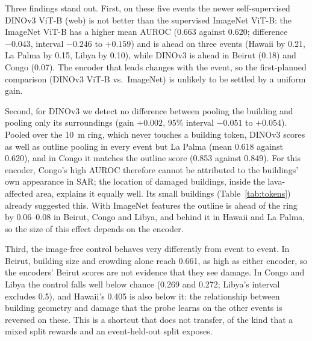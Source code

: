 \documentclass[journal]{IEEEtran}
\begin{document}
Three findings stand out. First, on these five events the newer self-supervised DINOv3 ViT-B (web) is not better than the supervised ImageNet ViT-B: the ImageNet ViT-B has a higher mean AUROC (0.663 against 0.620; difference $-0.043$, interval $-0.246$ to $+0.159$) and is ahead on three events (Hawaii by 0.21, La Palma by 0.15, Libya by 0.10), while DINOv3 is ahead in Beirut (0.18) and Congo (0.07). The encoder that leads changes with the event, so the first-planned comparison (DINOv3 ViT-B vs.\ ImageNet) is unlikely to be settled by a uniform gain.

Second, for DINOv3 we detect no difference between pooling the building and pooling only its surroundings (gain $+0.002$, 95\% interval $-0.051$ to $+0.054$). Pooled over the 10~m ring, which never touches a building token, DINOv3 scores as well as outline pooling in every event but La Palma (mean 0.618 against 0.620), and in Congo it matches the outline score (0.853 against 0.849). For this encoder, Congo's high AUROC therefore cannot be attributed to the buildings' own appearance in SAR; the location of damaged buildings, inside the lava-affected area, explains it equally well. Its small buildings (Table~\ref{tab:tokens}) already suggested this. With ImageNet features the outline is ahead of the ring by 0.06--0.08 in Beirut, Congo and Libya, and behind it in Hawaii and La Palma, so the size of this effect depends on the encoder.

Third, the image-free control behaves very differently from event to event. In Beirut, building size and crowding alone reach 0.661, as high as either encoder, so the encoders' Beirut scores are not evidence that they see damage. In Congo and Libya the control falls well below chance (0.269 and 0.272; Libya's interval excludes 0.5), and Hawaii's 0.405 is also below it: the relationship between building geometry and damage that the probe learns on the other events is reversed on these. This is a shortcut that does not transfer, of the kind that a mixed split rewards and an event-held-out split exposes.
\end{document}
